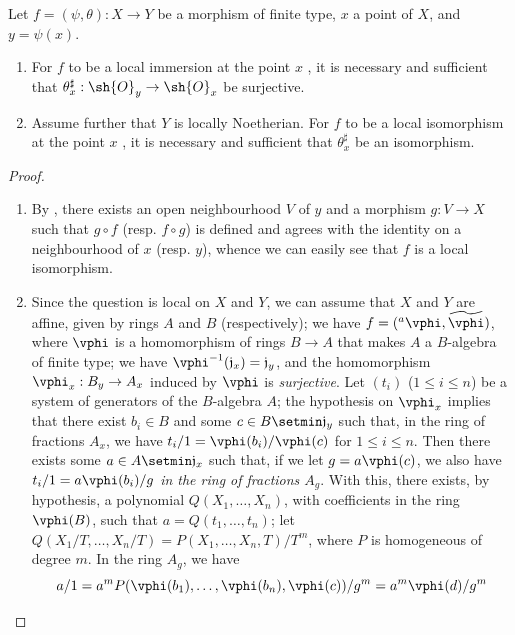 \begin{proposition}[6.5.4]
\label{I.6.5.4}
Let $f=(\psi,\theta):X\to Y$ be a morphism of finite type, $x$ a point of $X$, and $y=\psi(x)$.
\begin{enumerate}
  \item[{\rm(i)}] For $f$ to be a local immersion at the point $x$ , it is necessary and sufficient that $\theta_x^\sharp:\sh{O}_y\to\sh{O}_x$ be surjective.
  \item[{\rm(ii)}] Assume further that $Y$ is locally Noetherian.
    For $f$ to be a local isomorphism at the point $x$ , it is necessary and sufficient that $\theta_x^\sharp$ be an isomorphism.
\end{enumerate}
\end{proposition}

\begin{proof}
\medskip\noindent
\begin{enumerate}
  \item[(ii)] By , there exists an open neighbourhood $V$ of $y$ and a morphism $g:V\to X$ such that $g\circ f$ (resp. $f\circ g$) is defined and agrees with the identity on a neighbourhood of $x$ (resp. $y$), whence we can easily see that $f$ is a local isomorphism.
  \item[(i)] Since the question is local on $X$ and $Y$, we can assume that $X$ and $Y$ are affine, given by rings $A$ and $B$ (respectively);
    we have $f=({}^a\vphi,\widetilde{\vphi})$, where $\vphi$ is a homomorphism of rings $B\to A$ that makes $A$ a $B$-algebra of finite type;
    we have $\vphi^{-1}(\mathfrak{j}_x)=\mathfrak{j}_y$, and the homomorphism $\vphi_x:B_y\to A_x$ induced by $\vphi$ is \emph{surjective}.
    Let $(t_i)$ ($1\leq i\leq n$) be a system of generators of the $B$-algebra $A$;
    the hypothesis on $\vphi_x$ implies that there exist $b_i\in B$ and some $c\in B\setmin\mathfrak{j}_y$ such that, in the ring of fractions $A_x$, we have $t_i/1=\vphi(b_i)/\vphi(c)$ for $1\leq i\leq n$.
    Then  there exists some $a\in A\setmin\mathfrak{j}_x$ such that, if we let $g=a\vphi(c)$, we also have $t_i/1=a\vphi(b_i)/g$ \emph{in the ring of fractions $A_g$}.
    With this, there exists, by hypothesis, a polynomial $Q(X_1,\ldots,X_n)$, with coefficients in the ring $\vphi(B)$, such that $a=Q(t_1,\ldots,t_n)$;
    let $Q(X_1/T,\ldots,X_n/T)=P(X_1,\ldots,X_n,T)/T^m$, where $P$ is homogeneous of degree $m$.
    In the ring $A_g$, we have
    \[
      a/1=a^mP(\vphi(b_1),\ldots,\vphi(b_n),\vphi(c))/g^m=a^m\vphi(d)/g^m
\]
\end{enumerate}
\end{proof}
